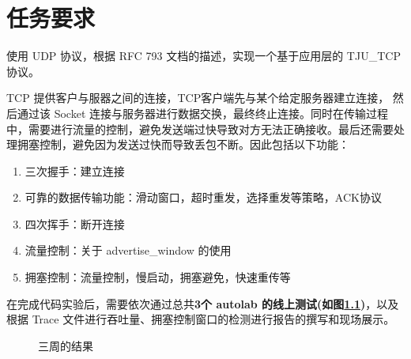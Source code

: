 
\chapter{任务要求}

使用 UDP 协议，根据 RFC 793 文档的描述，实现一个基于应用层的 TJU\_TCP 协议。

TCP 提供客户与服器之间的连接，TCP客户端先与某个给定服务器建立连接， 然后通过该 Socket 连接与服务器进行数据交换，最终终止连接。同时在传输过程中，需要进行流量的控制，避免发送端过快导致对方无法正确接收。最后还需要处理拥塞控制，避免因为发送过快而导致丢包不断。因此包括以下功能：

\begin{enumerate}
  \item 三次握手：建立连接
  \item 可靠的数据传输功能：滑动窗口，超时重发，选择重发等策略，ACK协议
  \item 四次挥手：断开连接
  \item 流量控制：关于 advertise\_window 的使用
  \item 拥塞控制：流量控制，慢启动，拥塞避免，快速重传等
\end{enumerate}

在完成代码实验后，需要依次通过总共\textbf{3个 autolab 的线上测试(如图\ref{fig:result})}，以及根据 Trace 文件进行吞吐量、拥塞控制窗口的检测进行报告的撰写和现场展示。


\begin{figure}[!htbp]
  \centering
  \caption{三周的结果}\label{fig:result}
\end{figure}



